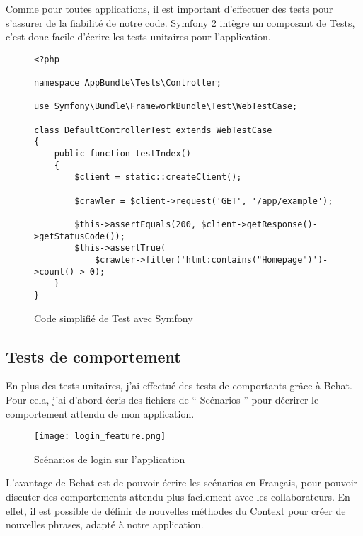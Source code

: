 Comme pour toutes applications, il est important d'effectuer des tests pour s'assurer de la fiabilité de notre code. Symfony 2 intègre un composant de Tests, c'est donc facile d'écrire les tests unitaires pour l'application.

\begin{figure}[h]
\begin{lstlisting}[frame=single]
<?php

namespace AppBundle\Tests\Controller;

use Symfony\Bundle\FrameworkBundle\Test\WebTestCase;

class DefaultControllerTest extends WebTestCase
{
    public function testIndex()
    {
        $client = static::createClient();

        $crawler = $client->request('GET', '/app/example');

        $this->assertEquals(200, $client->getResponse()->getStatusCode());
        $this->assertTrue(
            $crawler->filter('html:contains("Homepage")')->count() > 0);
    }
}

\end{lstlisting}
\caption{Code simplifié de Test avec Symfony}
\end{figure}

\subsection{Tests de comportement}

En plus des tests unitaires, j'ai effectué des tests de comportants grâce à Behat. Pour cela, j'ai d'abord écris des fichiers de `` Scénarios '' pour décrirer le comportement attendu de mon application.

\begin{figure}[h]
\begin{center}
\texttt{[image: login\_feature.png]}
\end{center}
\caption{Scénarios de login sur l'application}
\end{figure}

\newpage

L'avantage de Behat est de pouvoir écrire les scénarios en Français, pour pouvoir discuter des comportements attendu plus facilement avec les collaborateurs. En effet, il est possible de définir de nouvelles méthodes du Context pour créer de nouvelles phrases, adapté à notre application.